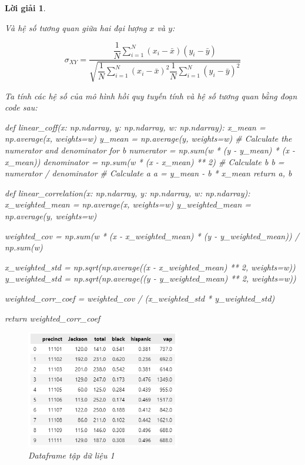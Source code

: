 \documentclass[14pt, a4paper]{article}
\theoremstyle{sltheorem}
\theoremstyle{soltheorem}
\newtheorem*{loigiai}{Lời giải}
\begin{document}
\begin{loigiai}
\begin{enumerate}
        Và hệ số tương quan giữa hai đại lượng $x$ và $y$:

        \begin{equation*}
            \sigma_{XY} = \dfrac{\dfrac{1}{N} \sum_{i=1}^N (x_i - \bar{x})(y_i - \bar{y})}{\sqrt{\dfrac{1}{N} \sum_{i=1}^N (x_i - \bar{x})^2 \dfrac{1}{N} \sum_{i=1}^N (y_i - \bar{y})^2}}
        \end{equation*}

        Ta tính các hệ số của mô hình hồi quy tuyến tính và hệ số tương quan bằng đoạn code sau:

        \begin{python}
def linear_coff(x: np.ndarray, y: np.ndarray, w: np.ndarray):
    x_mean = np.average(x, weights=w)
    y_mean = np.average(y, weights=w)
    # Calculate the numerator and denominator for b
    numerator = np.sum(w * (y - y_mean) * (x - x_mean))
    denominator = np.sum(w * (x - x_mean) ** 2)
    # Calculate b
    b = numerator / denominator
    # Calculate a
    a = y_mean - b * x_mean
    return a, b
        \end{python}


\begin{python}
def linear_correlation(x: np.ndarray, y: np.ndarray, w: np.ndarray):
    x_weighted_mean = np.average(x, weights=w)
    y_weighted_mean = np.average(y, weights=w)
    
    weighted_cov = np.sum(w * (x - x_weighted_mean) * (y - y_weighted_mean)) / np.sum(w)
    
    x_weighted_std = np.sqrt(np.average((x - x_weighted_mean) ** 2, weights=w))
    y_weighted_std = np.sqrt(np.average((y - y_weighted_mean) ** 2, weights=w))
    
    weighted_corr_coef = weighted_cov / (x_weighted_std * y_weighted_std)
    
    return weighted_corr_coef
\end{python}

    \begin{figure}[H]
        \centering
        \includegraphics[width=0.6\textwidth]{figures/primary_df.png}
        \caption{Dataframe tập dữ liệu 1}
        \label{fig:primary_df}
    \end{figure}


\end{enumerate}
\end{loigiai}
\end{document}
